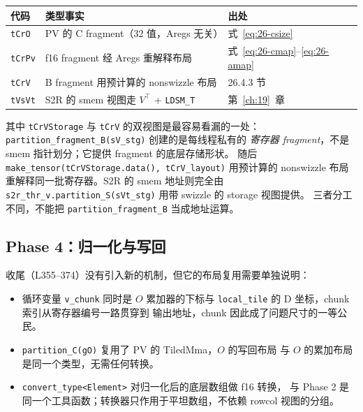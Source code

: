 \begin{center}
\begin{tabular}{p{4.6cm}p{6.4cm}p{4.2cm}}
\toprule
代码 & 类型事实 & 出处 \\
\midrule
\texttt{tCrO} & PV 的 C fragment（32 值，Aregs 无关） & 式~\eqref{eq:26-csize} \\
\texttt{tCrPv} & f16 fragment 经 Aregs 重解释布局 & 式~\eqref{eq:26-cmap}--\eqref{eq:26-amap} \\
\texttt{tCrV} & B fragment 用预计算的 nonswizzle 布局 & 26.4.3 节 \\
\texttt{tVsVt} & S2R 的 smem 视图走 $V^\top$ + \texttt{LDSM\_T} & 第~\ref{ch:19}~章 \\
\bottomrule
\end{tabular}
\end{center}

其中 \texttt{tCrVStorage} 与 \texttt{tCrV} 的双视图是最容易看漏的一处：
\texttt{partition\_\allowbreak{}fragment\_\allowbreak{}B(sV\_stg)} 创建的是每线程私有的
\emph{寄存器 fragment}，不是 smem 指针划分；它提供 fragment 的底层存储形状。
随后 \texttt{make\_tensor(tCrVStorage.data(), tCrV\_layout)} 用预计算的
nonswizzle 布局重解释同一批寄存器。S2R 的 smem 地址则完全由
\texttt{s2r\_thr\_v.partition\_S(sVt\_stg)} 用带 swizzle 的 storage 视图提供。
三者分工不同，不能把 \texttt{partition\_fragment\_B} 当成地址运算。

\subsection{Phase 4：归一化与写回}

收尾（L355--374）没有引入新的机制，但它的布局复用需要单独说明：



\begin{itemize}[itemsep=2pt,topsep=2pt]
  \item 循环变量 \texttt{v\_chunk} 同时是 $O$ 累加器的下标与
        \texttt{local\_tile} 的 D 坐标，chunk 索引从寄存器编号一路贯穿到
        输出地址，chunk 因此成了问题尺寸的一等公民。
  \item \texttt{partition\_\allowbreak{}C\allowbreak{}(g\allowbreak{}O)} 复用了 PV 的 TiledMma，$O$ 的写回布局
        与 $O$ 的累加布局是同一个类型，无需任何转换。
  \item \texttt{convert\_\allowbreak{}type\allowbreak{}<Element>} 对归一化后的底层数组做 f16 转换，
        与 Phase 2 是同一个工具函数；转换器只作用于平坦数组，不依赖
        rowcol 视图的分组。
\end{itemize}

